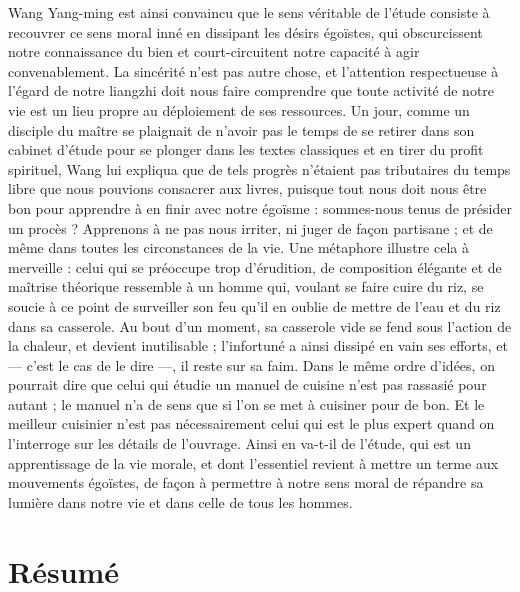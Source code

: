 Wang Yang-ming est ainsi convaincu que le sens véritable de l'étude consiste à recouvrer ce sens moral inné en dissipant les désirs égoïstes, qui obscurcissent notre
connaissance du bien et court-circuitent notre capacité à agir convenablement.
La sincérité n'est pas autre chose, et l'attention respectueuse à l'égard de notre liangzhi
doit nous faire comprendre que toute activité de notre vie est un lieu propre au déploiement de ses ressources.
Un jour, comme un disciple du maître se plaignait de n'avoir
pas le temps de se retirer dans son cabinet d'étude pour se plonger dans les textes classiques et en tirer du profit spirituel, Wang lui expliqua que de tels progrès n'étaient pas
tributaires du temps libre que nous pouvions consacrer aux livres, puisque tout nous doit
nous être bon pour apprendre à en finir avec notre égoïsme : sommes-nous tenus de présider un procès ? Apprenons à ne pas nous irriter, ni juger de façon partisane ; et de
même dans toutes les circonstances de la vie.
Une métaphore illustre cela à merveille :
celui qui se préoccupe trop d'érudition, de composition élégante et de maîtrise théorique
ressemble à un homme qui, voulant se faire cuire du riz, se soucie à ce point de surveiller son feu qu'il en oublie de mettre de l'eau et du riz dans sa casserole.
Au bout d'un
moment, sa casserole vide se fend sous l'action de la chaleur, et devient inutilisable ;
l'infortuné a ainsi dissipé en vain ses efforts, et --- c'est le cas de le dire ---, il reste sur sa
faim.
Dans le même ordre d'idées, on pourrait dire que celui qui étudie un manuel de
cuisine n'est pas rassasié pour autant ; le manuel n'a de sens que si l'on se met à cuisiner pour de bon.
Et le meilleur cuisinier n'est pas nécessairement celui qui est le plus
expert quand on l'interroge sur les détails de l'ouvrage.
Ainsi en va-t-il de l'étude,
qui est un apprentissage de la vie morale, et dont l'essentiel revient à mettre un terme
aux mouvements égoïstes, de façon à permettre à notre sens moral de répandre sa lumière dans notre vie et dans celle de tous les hommes.

\section{Résumé}
